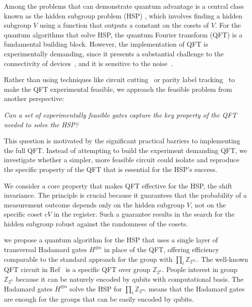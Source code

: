 \documentclass[aps,reprint,showpacs,tightenlines, twocolumn]{revtex4-2}
\newcommand{\ZZ}{\mathbb{Z}}
\begin{document}
Among the problems that can demonstrate quantum advantage is a central class known as the hidden subgroup problem (HSP) \cite{hallgren2003hidden, lomont2004hidden}, which involves finding a hidden subgroup $V$ using a function that outputs a constant on the cosets of $V$. For the quantum algorithms that solve HSP, the quantum Fourier transform (QFT) is a fundamental building block. However, the implementation of QFT is experimentally demanding, since it presents a substantial challenge to the connectivity of devices~\cite{jin2024optimizing}, and it is sensitive to the noise~\cite{wang2025accelerating}.

Rather than using techniques like circuit cutting~\cite{tang2021cutqc, ayral2021quantum} or parity label tracking~\cite{klaver2024swap} to make the QFT experimental feasible, we approach the feasible problem from another perspective:
\begin{center}
    \emph{Can a set of experimentally feasible gates capture the key property of the QFT needed to solve the HSP?}
\end{center}
This question is motivated by the significant practical barriers to implementing the full QFT. Instead of attempting to build the experiment demanding QFT, we investigate whether a simpler, more feasible circuit could isolate and reproduce the specific property of the QFT that is essential for the HSP's success.

We consider a core property that makes QFT effective for the HSP, the shift invariance. The principle is crucial because it guarantees that the probability of a measurement outcome depends only on the hidden subgroup $V$, not on the specific coset $c V$ in the register.
Such a guarantee results in the search for the hidden subgroup robust against the randomness of the cosets.


we propose a quantum algorithm for the HSP that uses a single layer of transversal Hadamard gates $H^{\otimes n}$ in place of the QFT, offering efficiency comparable to the standard approach for the group with $\prod_i \ZZ_{2^{m_i}}$. 
The well-known QFT circuit in Ref~\cite{nielsen2010quantum} is a specific QFT over group $\ZZ_{2^n}$. People interest in group $\ZZ_{2^n}$ because it can be naturely encoded by qubits with computational basis. The Hadamard gates $H^{\otimes n}$ solve the HSP for $\prod_i \ZZ_{2^{m_i}}$ means that the Hadamard gates are enough for the groups that can be easily encoded by qubits.
\end{document}
